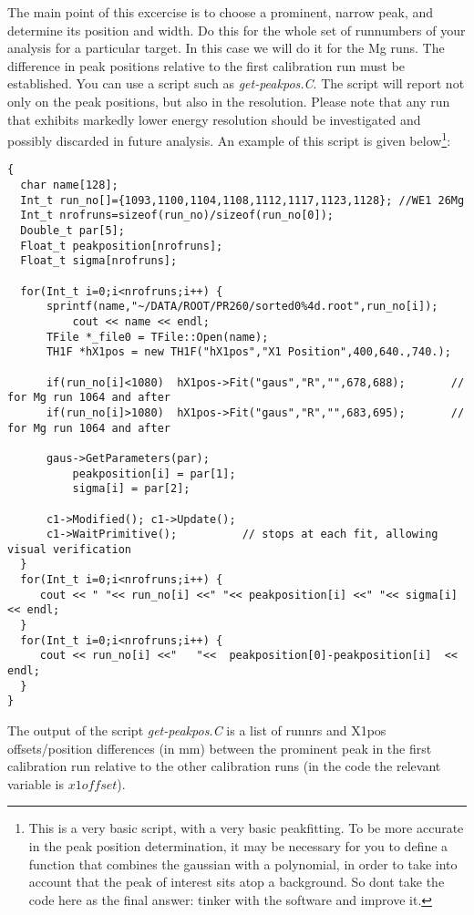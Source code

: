 \documentclass[11pt]{report}
\begin{document}
\begin{enumerate}
The main point of this excercise is to choose a prominent, narrow peak, and determine its position
and width. Do this for the whole set of runnumbers of your analysis for a particular target.
In this case we will do it for the Mg runs.
The difference in peak positions relative to the first calibration run must be established.
You can use a script such as {\it get-peakpos.C}.
The script will report not only on the peak positions, but also in the resolution. 
Please note that any run that exhibits markedly lower energy resolution should be investigated 
and possibly discarded in future analysis. An example of this script is given below\footnote{This is a 
very basic
script, with a very basic peakfitting. To be more accurate in the peak position determination, it
may be necessary for you to define a function that combines the gaussian with a polynomial, in order
to take into account that the peak of interest sits atop a background. So dont take the
code here as the final answer: tinker with the software and improve it.}:

\begin{verbatim} 
{
  char name[128];
  Int_t run_no[]={1093,1100,1104,1108,1112,1117,1123,1128}; //WE1 26Mg
  Int_t nrofruns=sizeof(run_no)/sizeof(run_no[0]);   
  Double_t par[5];
  Float_t peakposition[nrofruns];
  Float_t sigma[nrofruns];

  for(Int_t i=0;i<nrofruns;i++)	{
	  sprintf(name,"~/DATA/ROOT/PR260/sorted0%4d.root",run_no[i]);
          cout << name << endl;
	  TFile *_file0 = TFile::Open(name);     
  	  TH1F *hX1pos = new TH1F("hX1pos","X1 Position",400,640.,740.);

	  if(run_no[i]<1080)  hX1pos->Fit("gaus","R","",678,688);       // for Mg run 1064 and after
	  if(run_no[i]>1080)  hX1pos->Fit("gaus","R","",683,695);       // for Mg run 1064 and after

	  gaus->GetParameters(par);
          peakposition[i] = par[1];
          sigma[i] = par[2];

	  c1->Modified(); c1->Update();
	  c1->WaitPrimitive();          // stops at each fit, allowing visual verification
  }
  for(Int_t i=0;i<nrofruns;i++)	{
     cout << " "<< run_no[i] <<" "<< peakposition[i] <<" "<< sigma[i] << endl;
  }
  for(Int_t i=0;i<nrofruns;i++)	{
     cout << run_no[i] <<"   "<<  peakposition[0]-peakposition[i]  << endl;
  }
}
\end{verbatim}

The output of the script {\it get-peakpos.C} is a list of runnrs and X1pos offsets/position differences 
(in mm) between the prominent peak in the first calibration
run relative to the other calibration runs (in the code the relevant variable is $x1offset$).


\end{enumerate}
\end{document}

